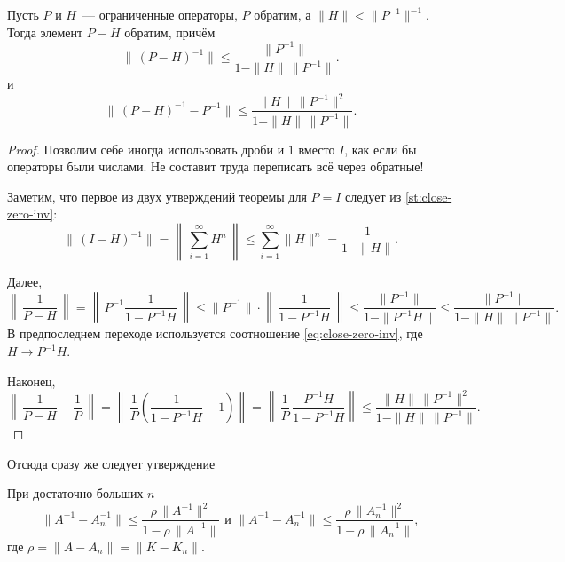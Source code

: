 \documentclass{trlnotes}
\begin{document}
    \begin{st} \label{st:close-inv}
        Пусть $P$ и $H$~--- ограниченные операторы, $P$ обратим, а $\|H\| < \|P^{-1}\|^{-1}$. Тогда элемент $P - H$ обратим, причём
        \[
            \big\| \, (P - H)^{-1}\big\|  \leqslant \dfrac{\|P^{-1}\|}{1 - \|H\| \, \|P^{-1}\|}. 
        \]
        и
        \[
            \big\| \, (P - H)^{-1} - P^{-1}\big\| \leqslant \dfrac{\|H\| \, \|P^{-1}\|^2}{1 - \|H\| \, \|P^{-1}\|}.
        \]
        \begin{proof}
            Позволим себе иногда использовать дроби и $1$ вместо $I$, как если бы операторы были числами. Не составит труда переписать всё через обратные!

            Заметим, что первое из двух утверждений теоремы для $P = I$ следует из \ref{st:close-zero-inv}:
            \begin{equation}\label{eq:close-zero-inv}
                \big\| \, (I - H)^{-1}\big\| = \left \| \, \sum\limits_{i = 1}^{\infty} H^n \, \right\| \leqslant \sum\limits_{i = 1}^{\infty} \|H\|^n = \dfrac{1}{1 - \|H\|}.
            \end{equation}

            Далее,
            \[
                \left\|\, \dfrac{1}{P - H} \,\right \| = \left\|\, P^{-1} \dfrac{1}{1 - P^{-1}H} \,\right \| \leqslant \|P^{-1}\| \cdot \left\|\,\dfrac{1}{1 - P^{-1}H} \,\right \| \leqslant \dfrac{\|P^{-1}\|}{1 - \|P^{-1}H\|} \leqslant \dfrac{\|P^{-1}\|}{1 - \|H\| \, \|P^{-1}\|}.
            \]
            В предпоследнем переходе используется соотношение \ref{eq:close-zero-inv}, где $H \to P^{-1}H$.

            Наконец,
            \[
                \left\|\, \dfrac{1}{P - H} - \dfrac{1}{P}\,\right \| = \left\|\, \dfrac{1}{P}\left(\dfrac{1}{1 - P^{-1}H} - 1 \right)\right \| =  \left\|\, \dfrac{1}{P} \, \dfrac{P^{-1}H}{1 - P^{-1}H} \right \| \leqslant \dfrac{\|H\| \, \|P^{-1}\|^2}{1 - \|H\| \, \|P^{-1}\|}.
            \]
        \end{proof}
    \end{st}

    Отсюда сразу же следует утверждение

    \begin{st}\label{st:dif-inv}
        При достаточно больших $n$
        \[
            \big\|A^{-1} - A_n^{-1}\big\| \leqslant \dfrac{\rho \, \|A^{-1}\|^2}{1 - \rho \, \|A^{-1}\|} \text{ и } \big\|A^{-1} - A_n^{-1}\big\| \leqslant \dfrac{\rho \, \|A_n^{-1}\|^2}{1 - \rho \, \|A_n^{-1}\|},
        \]
        где $\rho = \|A - A_n\| = \|K - K_n\|$.
    \end{st}
\end{document}
